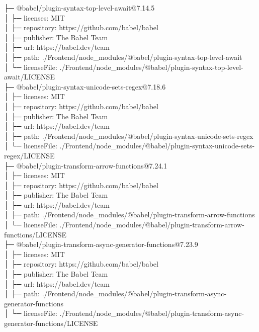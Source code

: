 ├─ @babel/plugin-syntax-top-level-await@7.14.5\\
│  ├─ licenses: MIT\\
│  ├─ repository: https://github.com/babel/babel\\
│  ├─ publisher: The Babel Team\\
│  ├─ url: https://babel.dev/team\\
│  ├─ path: ./Frontend/node\_modules/@babel/plugin-syntax-top-level-await\\
│  └─ licenseFile: ./Frontend/node\_modules/@babel/plugin-syntax-top-level-await/LICENSE\\
├─ @babel/plugin-syntax-unicode-sets-regex@7.18.6\\
│  ├─ licenses: MIT\\
│  ├─ repository: https://github.com/babel/babel\\
│  ├─ publisher: The Babel Team\\
│  ├─ url: https://babel.dev/team\\
│  ├─ path: ./Frontend/node\_modules/@babel/plugin-syntax-unicode-sets-regex\\
│  └─ licenseFile: ./Frontend/node\_modules/@babel/plugin-syntax-unicode-sets-regex/LICENSE\\
├─ @babel/plugin-transform-arrow-functions@7.24.1\\
│  ├─ licenses: MIT\\
│  ├─ repository: https://github.com/babel/babel\\
│  ├─ publisher: The Babel Team\\
│  ├─ url: https://babel.dev/team\\
│  ├─ path: ./Frontend/node\_modules/@babel/plugin-transform-arrow-functions\\
│  └─ licenseFile: ./Frontend/node\_modules/@babel/plugin-transform-arrow-functions/LICENSE\\
├─ @babel/plugin-transform-async-generator-functions@7.23.9\\
│  ├─ licenses: MIT\\
│  ├─ repository: https://github.com/babel/babel\\
│  ├─ publisher: The Babel Team\\
│  ├─ url: https://babel.dev/team\\
│  ├─ path: ./Frontend/node\_modules/@babel/plugin-transform-async-generator-functions\\
│  └─ licenseFile: ./Frontend/node\_modules/@babel/plugin-transform-async-generator-functions/LICENSE\\
